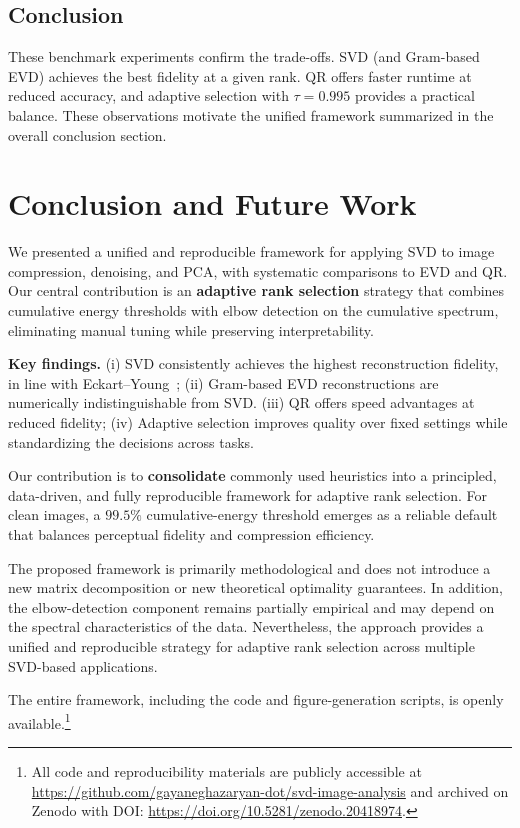 \documentclass[11pt,a4paper]{article}
\begin{document}
\subsection{Conclusion}

These benchmark experiments confirm the trade-offs. 
SVD (and Gram-based EVD) achieves the best fidelity at a given rank. 
QR offers faster runtime at reduced accuracy, 
and adaptive selection with $\tau=0.995$ provides a practical balance.
These observations motivate the unified framework summarized in the overall conclusion section.

\section{Conclusion and Future Work}
\label{sec:conclusion}

We presented a unified and reproducible framework for applying SVD to image compression, 
denoising, and PCA, with systematic comparisons to EVD and QR. 
Our central contribution is an \textbf{adaptive rank selection} strategy that combines 
cumulative energy thresholds with elbow detection on the cumulative spectrum, 
eliminating manual tuning while preserving interpretability.

\textbf{Key findings.} 
(i) SVD consistently achieves the highest reconstruction fidelity, in line with 
Eckart--Young~\cite{eckart1936approximation}; 
(ii) Gram-based EVD reconstructions are numerically indistinguishable from SVD. 
(iii) QR offers speed advantages at reduced fidelity; 
(iv) Adaptive selection improves quality over fixed settings while standardizing the decisions across tasks.

Our contribution is to \textbf{consolidate} commonly used heuristics into a principled, data-driven, and fully reproducible framework for adaptive rank selection. 
For clean images, a $99.5\%$ cumulative-energy threshold emerges as a reliable default that balances perceptual fidelity and compression efficiency.

The proposed framework is primarily methodological and does not introduce a new matrix decomposition or new theoretical optimality guarantees. 
In addition, the elbow-detection component remains partially empirical and may depend on the spectral characteristics of the data. 
Nevertheless, the approach provides a unified and reproducible strategy for adaptive rank selection across multiple SVD-based applications.

The entire framework, including the code and figure-generation scripts, is openly available.\footnote{All code and reproducibility materials are publicly accessible at
\url{https://github.com/gayaneghazaryan-dot/svd-image-analysis}
and archived on Zenodo with DOI:
\url{https://doi.org/10.5281/zenodo.20418974}.}
\end{document}
